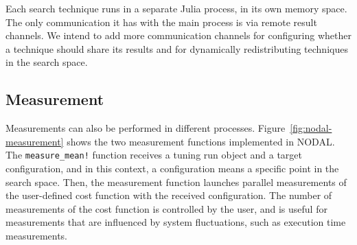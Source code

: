 Each search technique runs in a separate Julia process, in its own
memory space. The only communication it has with the main process
is via remote result channels. We intend to add more communication
channels for configuring whether a technique should share its results
and for dynamically redistributing techniques in the search space.

\subsection{Measurement}
\label{sec:nodal-measurement}

Measurements can also be performed in different processes.
Figure~\ref{fig:nodal-measurement} shows the two measurement functions
implemented in NODAL. The \texttt{measure\_mean!} function receives a tuning
run object and a target configuration, and in this context, a configuration
means a specific point in the search space. Then, the measurement function
launches parallel measurements of the user-defined cost function with the
received configuration. The number of measurements of the cost function is
controlled by the user, and is useful for measurements that are influenced by
system fluctuations, such as execution time measurements.

